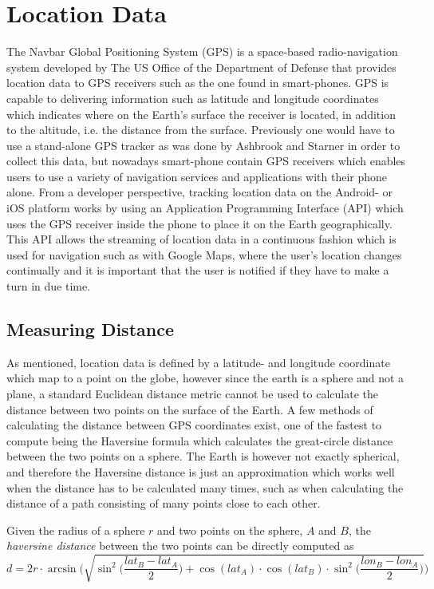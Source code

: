 \section{Location Data}
The Navbar Global Positioning System (GPS) is a space-based radio-navigation system developed by The US Office of the Department of Defense \cite{gps-navstar} that provides location data to GPS receivers such as the one found in smart-phones. GPS is capable to delivering information such as latitude and longitude coordinates which indicates where on the Earth's surface the receiver is located, in addition to the altitude, i.e. the distance from the surface. Previously one would have to use a stand-alone GPS tracker as was done by Ashbrook and Starner \cite{using_gps_to_learn_significant_locations} in order to collect this data, but nowadays smart-phone contain GPS receivers which enables users to use a variety of navigation services and applications with their phone alone. From a developer perspective,  tracking location data on the Android- or iOS platform works by using an Application Programming Interface (API) which uses the GPS receiver inside the phone to place it on the Earth geographically. This API allows the streaming of location data in a continuous fashion which is used for navigation such as with Google Maps, where the user's location changes continually and it is important that the user is notified if they have to make a turn in due time. 

\subsection{Measuring Distance}
As mentioned, location data is defined by a latitude- and longitude coordinate which map to a point on the globe, however since the earth is a sphere and not a plane, a standard Euclidean distance metric cannot be used to calculate the distance between two points on the surface of the Earth. A few methods of calculating the distance between GPS coordinates exist, one of the fastest to compute being the Haversine formula \cite{haversine-formula} which calculates the great-circle distance between the two points on a sphere. The Earth is however not exactly spherical, and therefore the Haversine distance is just an approximation which works well when the distance has to be calculated many times, such as when calculating the distance of a path consisting of many points close to each other.

Given the radius of a sphere $r$ and two points on the sphere, $A$ and $B$, the \textit{haversine distance} between the two points can be directly computed as 
$$d = 2r \cdot \arcsin \Bigg( \sqrt{\sin^2 \bigg( \frac{lat_B - lat_A}{2} \bigg) + \cos(lat_A) \cdot \cos(lat_B) \cdot \sin^2 \bigg(\frac{ lon_B - lon_A}{2} \bigg)}\Bigg)$$
